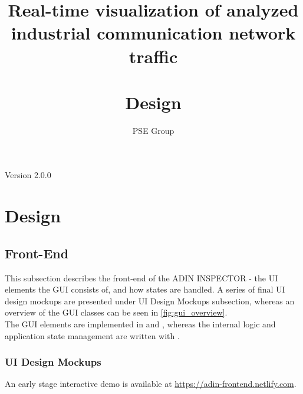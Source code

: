 \documentclass[oneside, english, final]{design}
\author{PSE Group}
\title{Real-time visualization of analyzed industrial communication network traffic\\ \hfill \\Design}
\begin{document}
\nocite{*}

\setpdf

\maketitle


\hfill

\begin{center}
	\large{Version 2.0.0}
\end{center}


\thispagestyle{empty}
\begin{abstract}
	\thispagestyle{empty}
\end{abstract}

\thispagestyle{empty}
\newpage
\thispagestyle{empty}
\tableofcontents
\cleardoublepage
\setcounter{page}{1}


\section{Design}\label{sec:intro}
\subsection{Front-End}
This subsection describes the front-end of the ADIN INSPECTOR - the UI elements the GUI consists of, and how states are handled. A series of final UI design mockups are presented under UI Design Mockups subsection, whereas an overview of the GUI classes can be seen in \autoref{fig:gui_overview}.\\

The GUI elements are implemented in \href{https://reactjs.org/}{\color{blue}{React}} and \href{https://material-ui.com/}{\color{blue}{Material UI}}, whereas the internal logic and application state management are written with \href{https://mobx.js.org/}{\color{blue}{MobX}}.

\subsubsection{UI Design Mockups}

An early stage interactive demo is available at \url{https://adin-frontend.netlify.com}.\\
\end{document}

